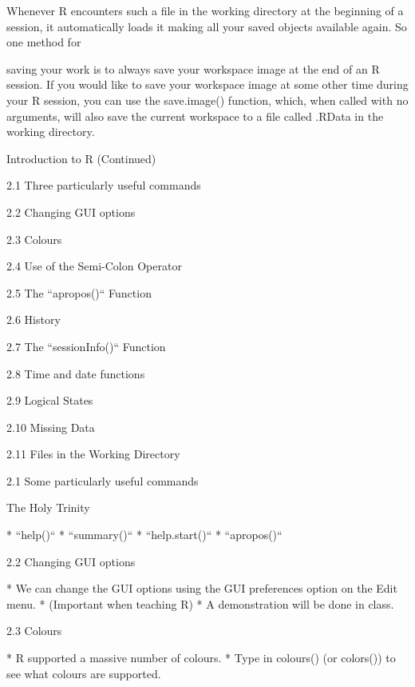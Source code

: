 \documentclass{beamer}
\begin{document}

Whenever R encounters such a file in the working directory at the beginning of a session,
it automatically loads it making all your saved objects available again. So one method for

saving your work is to always save your workspace image at the end of an R session. If you
would like to save your workspace image at some other time during your R session, you can use
the save.image() function, which, when called with no arguments, will also save the current
workspace to a file called .RData in the working directory.



{Introduction to R (Continued) }

\item[2.1] Three particularly useful commands    
\item[2.2] Changing GUI options     
\item[2.3] Colours      
\item[2.4] Use of the Semi-Colon Operator     
\item[2.5] The ``apropos()`` Function     
\item[2.6] History       
\item[2.7] The ``sessionInfo()`` Function     
\item[2.8] Time and date functions     
\item[2.9] Logical States      
\item[2.10] Missing Data      
\item[2.11] Files in the Working Directory     




{2.1 Some particularly useful commands}


The Holy Trinity

* ``help()``
* ``summary()``
* ``help.start()``
* ``apropos()``




{2.2 Changing GUI options}

* We can change the GUI options using the GUI preferences option on the Edit menu.
*  (Important
when teaching R) 
* A demonstration will be done in class.




{2.3 Colours}

* R supported a massive number of colours.
* Type in colours() (or colors()) to see what colours
are supported.
\end{document}
